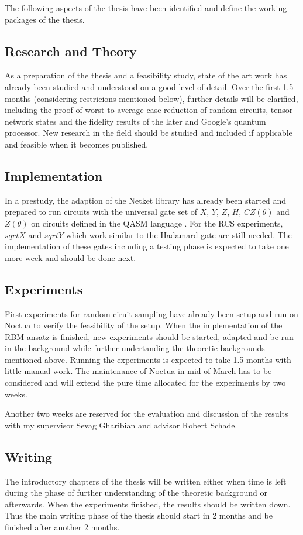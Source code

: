 The following aspects of the thesis have been identified and define the working packages of the thesis.

\subsection{Research and Theory}
As a preparation of the thesis and a feasibility study, state of the art work has already been studied 
and understood on a good level of detail. Over the first 1.5 months (considering restricions mentioned below), further details will be clarified, including 
the proof of worst to average case reduction of random circuits, tensor network states and the fidelity results 
of the later and Google's quantum processor. New research in the field should be studied and included if applicable and feasible when it becomes published.

\subsection{Implementation}
In a prestudy, the adaption of the Netket library has already been started and prepared to run circuits with 
the universal gate set of $X$, $Y$, $Z$, $H$, $CZ(\theta)$ and $Z(\theta)$ on circuits defined in the QASM language \cite{cross2017open}. For the RCS experiments, $sqrtX$ and $sqrtY$ which work similar to the Hadamard gate are still 
needed. The implementation of these gates including a testing phase is expected to take one more week and should
be done next.

\subsection{Experiments}
First experiments for random ciruit sampling have already been setup and run on Noctua to verify the feasibility of
the setup. When the implementation of the RBM ansatz is finished, new experiments should be started, adapted and be run in the 
background while further undertanding the theoretic backgrounds mentioned above. Running the experiments is expected 
to take 1.5 months with little manual work. The maintenance of Noctua in mid of March has to be considered
and will extend the pure time allocated for the experiments by two weeks.

Another two weeks are reserved for the evaluation and discussion of the results with my supervisor Sevag Gharibian and advisor Robert Schade.

\subsection{Writing}
The introductory chapters of the thesis will be written either when time is left during the phase of further 
understanding of the theoretic background or afterwards. When the experiments finished, the results should be written
down. Thus the main writing phase of the thesis should start in 2 months and be finished after another 2 months.

